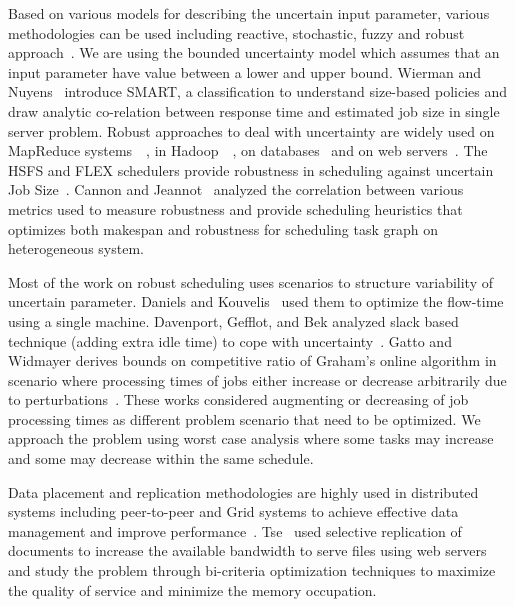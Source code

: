 \documentclass[10pt, conference, compsocconf]{IEEEtran}
\begin{document}
Based on various models for describing the uncertain input parameter,
various methodologies can be used including reactive, stochastic,
fuzzy and robust approach~\cite{DBLP:journals/cce/LiI08}. We are using
the bounded uncertainty model which assumes that an input parameter
have value between a lower and upper bound.  Wierman and
Nuyens~\cite{conf/sigmetrics/WiermanN08} introduce SMART, a
classification to understand size-based policies and draw analytic
co-relation between response time and estimated job size in single
server problem. Robust approaches to deal with uncertainty are widely
used on MapReduce
systems~\cite{Kavulya:2010:ATP:1844765.1845224}~\cite{Verma:2011:AAR:1998582.1998637},
in
Hadoop~\cite{Wolf:2010:FSA:2023718.2023720}~\cite{White:2009:HDG:1717298},
on databases~\cite{Lipton199518} and on web
servers~\cite{Cardellini99dynamicload}. The HSFS and FLEX schedulers
provide robustness in scheduling against uncertain Job
Size~\cite{Wolf:2010:FSA:2023718.2023720,6691554}. Cannon and
Jeannot~\cite{cj09c} analyzed the correlation between various metrics
used to measure robustness and provide scheduling heuristics that
optimizes both makespan and robustness for scheduling task graph on
heterogeneous system.

Most of the work on robust scheduling uses scenarios to structure
variability of uncertain parameter. Daniels and
Kouvelis~\cite{citeulike:8334169} used them to optimize the flow-time
using a single machine. Davenport, Gefflot, and Bek analyzed slack
based technique (adding extra idle time) to cope with
uncertainty~\cite{Davenport_slack-basedtechniques}. Gatto and Widmayer
derives bounds on competitive ratio of Graham’s online algorithm in
scenario where processing times of jobs either increase or decrease
arbitrarily due to perturbations~\cite{Gatto07}.  These works
considered augmenting or decreasing of job processing times as
different problem scenario that need to be optimized. We 
approach the problem using worst case analysis where some tasks may
increase and some may decrease within the same schedule.
  
Data placement and replication methodologies are highly used in
distributed systems including peer-to-peer and Grid systems to achieve
effective data management and improve
performance~\cite{Cirne2007213}\cite{Abawajy}\cite{4215379}. Tse~\cite{DBLP:journals/tc/Tse12}
used selective replication of documents to increase the available
bandwidth to serve files using web servers and study the problem
through bi-criteria optimization techniques to maximize the quality of
service and minimize the memory occupation.
\end{document}
